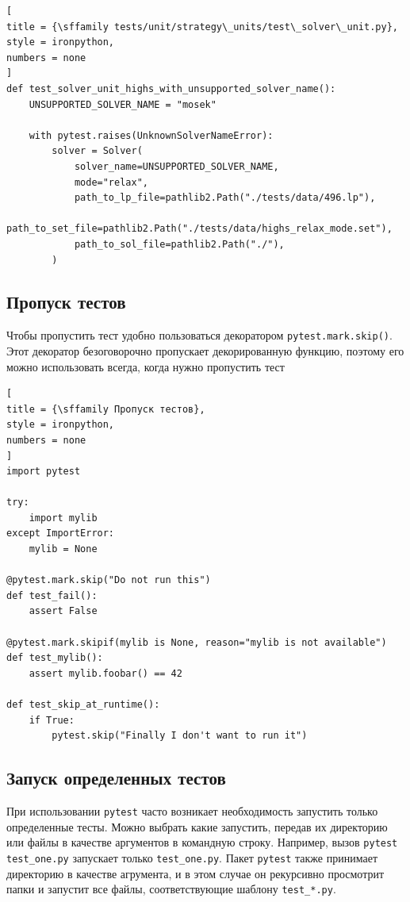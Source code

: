 \documentclass[%
	11pt,
	a4paper,
	utf8,
		]{article}
\begin{document}
\begin{lstlisting}[
title = {\sffamily tests/unit/strategy\_units/test\_solver\_unit.py},
style = ironpython,
numbers = none
]
def test_solver_unit_highs_with_unsupported_solver_name():
	UNSUPPORTED_SOLVER_NAME = "mosek"

	with pytest.raises(UnknownSolverNameError):
		solver = Solver(
			solver_name=UNSUPPORTED_SOLVER_NAME,
			mode="relax",
			path_to_lp_file=pathlib2.Path("./tests/data/496.lp"),
			path_to_set_file=pathlib2.Path("./tests/data/highs_relax_mode.set"),
			path_to_sol_file=pathlib2.Path("./"),
		)
\end{lstlisting}

\subsection{Пропуск тестов}

Чтобы пропустить тест удобно пользоваться декоратором \texttt{pytest.mark.skip()}. Этот декоратор безоговорочно пропускает декорированную функцию, поэтому его можно использовать всегда, когда нужно пропустить тест
\begin{lstlisting}[
title = {\sffamily Пропуск тестов},
style = ironpython,
numbers = none	
]
import pytest

try:
    import mylib
except ImportError:
    mylib = None
    
@pytest.mark.skip("Do not run this")
def test_fail():
    assert False
    
@pytest.mark.skipif(mylib is None, reason="mylib is not available")
def test_mylib():
    assert mylib.foobar() == 42
    
def test_skip_at_runtime():
    if True:
        pytest.skip("Finally I don't want to run it")
\end{lstlisting}

\subsection{Запуск определенных тестов}

При использовании \texttt{pytest} часто возникает необходимость запустить только определенные тесты. Можно выбрать какие запустить, передав их директорию или файлы в качестве аргументов в командную строку. Например, вызов \texttt{pytest test\_one.py} запускает только \texttt{test\_one.py}. Пакет \texttt{pytest} также принимает директорию в качестве агрумента, и в этом случае он рекурсивно просмотрит папки и запустит все файлы, соответствующие шаблону \texttt{test\_*.py}.
\end{document}

